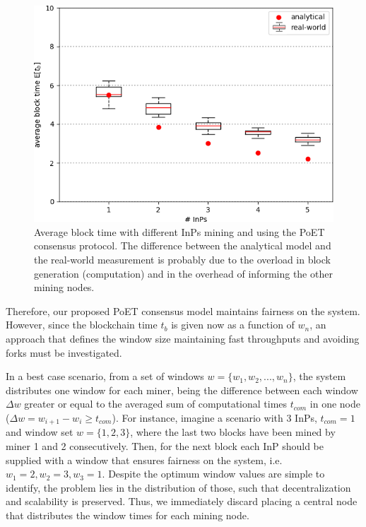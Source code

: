 \begin{figure}[bth]
	\centering
	\includegraphics[scale=0.7]{gfx/ev_block_time.png}    
  	\caption{Average block time with different InPs mining and using the PoET consensus protocol. The difference between the analytical model and the real-world measurement is probably due to the overload in block generation (computation) and in the overhead of informing the other mining nodes.}
  	\label{fig:block_time}
\end{figure}
  
  
Therefore, our proposed PoET consensus model maintains fairness on the system. However, since the blockchain time $t_b$ is given now as a function of $w_n$, an approach that defines the window size maintaining fast throughputs and avoiding forks must be investigated. 

In a best case scenario, from a set of windows $w = \{w_1,w_2,...,w_n\}$, the system distributes one window for each miner, being the difference between each window $\Delta w$ greater or equal to the averaged sum of computational times $t_{com}$ in one node ($\Delta w = w_{i+1} - w_i \geq t_{com} $). For instance, imagine a scenario with 3 InPs, $t_{com} = 1$ and window set $w = \{1,2,3\}$, where the last two blocks have been mined by miner 1 and 2 consecutively. Then, for the next block each InP should be supplied with a window that ensures fairness on the system, i.e. $w_1 = 2, w_2 = 3, w_3 = 1$. Despite the optimum window values are simple to identify, the problem lies in the distribution of those, such that decentralization and scalability is preserved. Thus, we immediately discard placing a central node that distributes the window times for each mining node.

